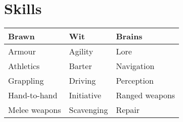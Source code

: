 
\section{Skills}
{\small\begin{tabular}{lll}
  Brawn         & Wit        & Brains         \\
  \hline
  Armour        & Agility    & Lore           \\
  Athletics     & Barter     & Navigation     \\
  Grappling     & Driving    & Perception     \\
  Hand-to-hand  & Initiative & Ranged weapons \\
  Melee weapons & Scavenging & Repair
\end{tabular}}
